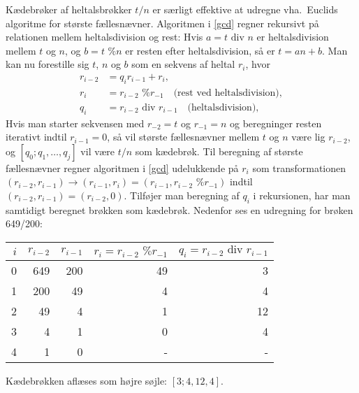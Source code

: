 \documentclass[a4paper,12pt]{article}
\begin{document}
Kædebrøker af heltalsbrøkker $t/n$ er særligt effektive at udregne vha.\ Euclids algoritme for største fællesnævner. Algoritmen i \ref{gcd} regner rekursivt på relationen mellem heltalsdivision og rest: Hvis $a = t \text{ div } n$ er heltalsdivision mellem $t$ og $n$, og $b = t \text{ \% } n$ er resten efter heltalsdivision, så er $t = a n + b$. Man kan nu forestille sig $t$, $n$ og $b$ som en sekvens af heltal $r_i$, hvor
\begin{align}
  r_{i-2} &= q_i r_{i-1} + r_i,
  \\r_i &= r_{i-2}\text{ \% }r_{-1}\quad\text{(rest ved heltalsdivision)},
  \\q_i &= r_{i-2}\text{ div }r_{i-1}\quad\text{(heltalsdivision)},
\end{align}
Hvis man starter sekvensen med $r_{-2} = t$ og $r_{-1}=n$ og beregninger resten iterativt indtil $r_{i-1}=0$, så vil største fællesnævner mellem $t$ og $n$ være lig $r_{i-2}$, og $[q_0; q_1,\ldots,q_j]$ vil være $t/n$ som kædebrøk. Til beregning af største fællesnævner regner algoritmen i \ref{gcd} udelukkende på $r_i$ som transformationen $(r_{i-2}, r_{i-1}) \rightarrow (r_{i-1}, r_i)  = (r_{i-1}, r_{i-2}\text{ \% }r_{-1})$ indtil $(r_{i-2}, r_{i-1}) = (r_{i-2},0)$. Tilføjer man beregning af $q_i$ i rekursionen, har man samtidigt beregnet brøkken som kædebrøk. Nedenfor ses en udregning for brøken 649/200:
\begin{center}
  \begin{tabular}{|r|r|r|r|r|}
    \hline
    $i$ & $r_{i-2}$ & $r_{i-1}$ & $r_i = r_{i-2}\text{ \% }r_{-1} $ & $q_i = r_{i-2} \text{ div } r_{i-1}$\\
    \hline
    0 & 649 & 200 & 49 & 3 \\
    1 & 200 & 49 & 4 & 4\\
    2 & 49 & 4 & 1  & 12\\
    3 & 4 & 1 & 0  & 4\\
    4 & 1 & 0 & -  & -\\
    \hline
  \end{tabular}
\end{center}
Kædebrøkken aflæses som højre søjle: $[3; 4, 12, 4]$.
\end{document}
